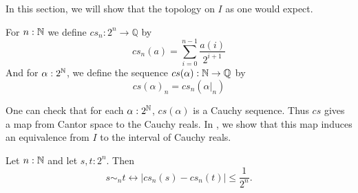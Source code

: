 In this section, we will show that the topology on $I$ as one would expect. 

\begin{definition}
  For $n:\mathbb{N}$ we define 
  $cs_n:2^n \to \mathbb Q$ by 
  \begin{equation}
    cs_n(a) = \sum\limits_{i=0}^{n-1} \frac{a(i)} {2^{i+1}}
  \end{equation}
  And for $\alpha:2^{\mathbb{N}}$, we define the sequence $cs(\alpha) : \mathbb{N} \to \mathbb Q$ by 
  \begin{equation}
    cs(\alpha)_n = cs_n(\alpha|_n)
  \end{equation}
\end{definition}
\begin{remark}
  One can check that for each $\alpha:2^{\mathbb{N}}$, 
  $cs(\alpha)$ is a Cauchy sequence. 
  Thus $cs$ gives a map from Cantor space to the Cauchy reals. 
  In , 
  we show that this map induces an equivalence from $I$ to the interval of Cauchy reals. 
\end{remark}

\begin{lemma}
  Let $n:\mathbb{N}$ and let $s,t:2^n$. Then 
  \begin{equation}
    s\sim_n t \leftrightarrow |cs_n(s) - cs_n(t)| \leq \frac{1}{2^{n}}.
  \end{equation} 
\end{lemma}

